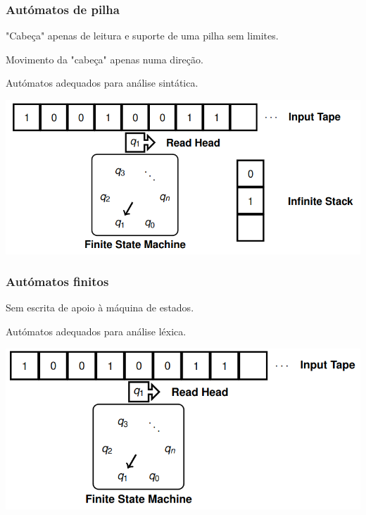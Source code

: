 \documentclass{article}
\begin{document}
\pagebreak

\subsubsection{Autómatos de pilha}

\begin{flushleft}
  \item "Cabeça" apenas de leitura e suporte de uma pilha sem
  limites.
  \item Movimento da "cabeça" apenas numa direção.
  \item Autómatos adequados para análise sintática.

  \begin{center}
    \includegraphics[scale=0.35]{18}
  \end{center}
\end{flushleft}

\subsubsection{Autómatos finitos}

\begin{flushleft}
  \item Sem escrita de apoio à máquina de estados.
  \item Autómatos adequados para análise léxica.

  \begin{center}
    \includegraphics[scale=0.35]{19}
  \end{center}
\end{flushleft}
\end{document}
